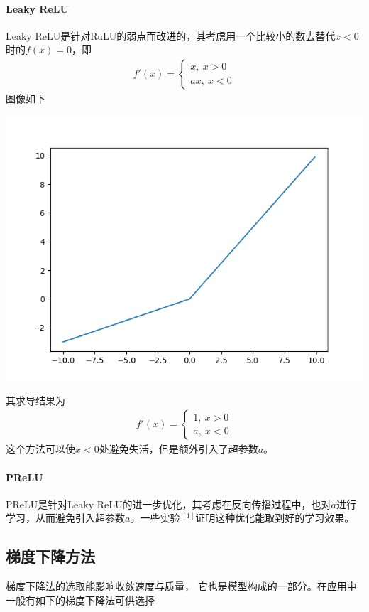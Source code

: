 \paragraph{Leaky ReLU}
Leaky ReLU是针对RuLU的弱点而改进的，其考虑用一个比较小的数去替代$x<0$时的$f(x)=0$，即
\begin{eqnarray}
f'(x)=
\left\lbrace
\begin{aligned}
x,\ x>0\\
ax,\ x<0
\end{aligned}
\right.
\end{eqnarray}
图像如下
\begin{center}
\includegraphics[scale=0.5]{../figures/NN7.png} 
\end{center}
其求导结果为
\begin{eqnarray}
f'(x)=
\left\lbrace
\begin{aligned}
1,\ x>0\\
a,\ x<0
\end{aligned}
\right.
\end{eqnarray}
这个方法可以使$x<0$处避免失活，但是额外引入了超参数$a$。
\paragraph{PReLU}PReLU是针对Leaky ReLU的进一步优化，其考虑在反向传播过程中，也对$a$进行学习，从而避免引入超参数$a$。一些实验$\ ^{[1]}$证明这种优化能取到好的学习效果。
\subsection{梯度下降方法}
梯度下降法的选取能影响收敛速度与质量，	它也是模型构成的一部分。在应用中一般有如下的梯度下降法可供选择

